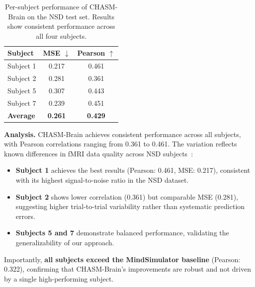 \begin{table}[h]
\centering
\caption{Per-subject performance of CHASM-Brain on the NSD test set.
Results show consistent performance across all four subjects.}
\label{tab:supp_per_subject}
\begin{tabular}{lcc}
\toprule
\textbf{Subject} & \textbf{MSE} $\downarrow$ & \textbf{Pearson} $\uparrow$ \\
\midrule
Subject 1 & 0.217 & 0.461 \\
Subject 2 & 0.281 & 0.361 \\
Subject 5 & 0.307 & 0.443 \\
Subject 7 & 0.239 & 0.451 \\
\midrule
\textbf{Average} & \textbf{0.261} & \textbf{0.429} \\
\bottomrule
\end{tabular}
\end{table}

\textbf{Analysis.}
CHASM-Brain achieves consistent performance across all subjects, with Pearson correlations
ranging from 0.361 to 0.461. The variation reflects known differences in fMRI data quality
across NSD subjects~\cite{allen2022massive}:

\begin{itemize}
    \item \textbf{Subject 1} achieves the best results (Pearson: 0.461, MSE: 0.217),
          consistent with its highest signal-to-noise ratio in the NSD dataset.
    \item \textbf{Subject 2} shows lower correlation (0.361) but comparable MSE (0.281),
          suggesting higher trial-to-trial variability rather than systematic prediction errors.
    \item \textbf{Subjects 5 and 7} demonstrate balanced performance,
          validating the generalizability of our approach.
\end{itemize}

Importantly, \textbf{all subjects exceed the MindSimulator baseline} (Pearson: 0.322),
confirming that CHASM-Brain's improvements are robust and not driven by a single high-performing subject.






